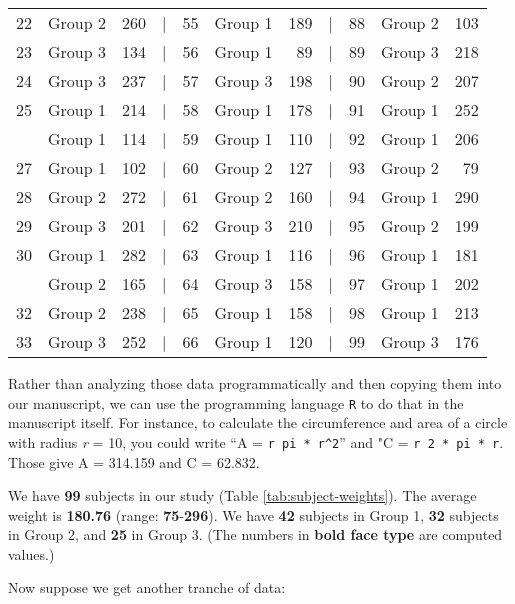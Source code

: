 \documentclass[smallextended]{svjour3}       %
\begin{document}
\begin{table}
\begin{tabular}[t]{rlrlrlrlrlr}
22 & Group 2 & 260 & | & 55 & Group 1 & 189 & | & 88 & Group 2 & 103\\
23 & Group 3 & 134 & | & 56 & Group 1 & 89 & | & 89 & Group 3 & 218\\
24 & Group 3 & 237 & | & 57 & Group 3 & 198 & | & 90 & Group 2 & 207\\
25 & Group 1 & 214 & | & 58 & Group 1 & 178 & | & 91 & Group 1 & 252\\
\addlinespace
26 & Group 1 & 114 & | & 59 & Group 1 & 110 & | & 92 & Group 1 & 206\\
27 & Group 1 & 102 & | & 60 & Group 2 & 127 & | & 93 & Group 2 & 79\\
28 & Group 2 & 272 & | & 61 & Group 2 & 160 & | & 94 & Group 1 & 290\\
29 & Group 3 & 201 & | & 62 & Group 3 & 210 & | & 95 & Group 2 & 199\\
30 & Group 1 & 282 & | & 63 & Group 1 & 116 & | & 96 & Group 1 & 181\\
\addlinespace
31 & Group 2 & 165 & | & 64 & Group 3 & 158 & | & 97 & Group 1 & 202\\
32 & Group 2 & 238 & | & 65 & Group 1 & 158 & | & 98 & Group 1 & 213\\
33 & Group 3 & 252 & | & 66 & Group 1 & 120 & | & 99 & Group 3 & 176\\
\bottomrule
\end{tabular}
\end{table}

Rather than analyzing those data programmatically and then copying them into our manuscript, we can use the programming language \texttt{R} to do that in the manuscript itself. For instance, to calculate the circumference and area of a circle with radius \emph{r} = 10, you could write ``A = \texttt{\textasciigrave{}r\ pi\ *\ r\^{}2\textasciigrave{}}'' and "C = \texttt{\textasciigrave{}r\ 2\ *\ pi\ *\ r\textasciigrave{}}. Those give A = 314.159 and C = 62.832.

We have \textbf{99} subjects in our study (Table \ref{tab:subject-weights}). The average weight is \textbf{180.76} (range: \textbf{75}-\textbf{296}). We have \textbf{42} subjects in Group 1, \textbf{32} subjects in Group 2, and \textbf{25} in Group 3. (The numbers in \textbf{bold face type} are computed values.)

Now suppose we get another tranche of data:
\end{document}

